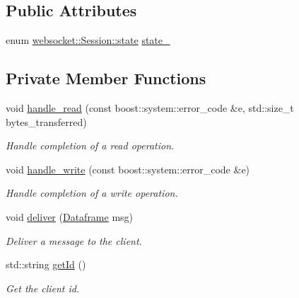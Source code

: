 \subsection*{Public Attributes}
\begin{DoxyCompactItemize}
\item 
enum \hyperlink{classwebsocket_1_1Session_a643e11bb9d05b580f20ff232f3582c1b}{websocket\+::\+Session\+::state} \hyperlink{classwebsocket_1_1Session_a8f9e0d65f4de675dd7b8242e17ee29b7}{state\+\_\+}
\end{DoxyCompactItemize}
\subsection*{Private Member Functions}
\begin{DoxyCompactItemize}
\item 
void \hyperlink{classwebsocket_1_1Session_ad23257dd2bffa48e90ed9941d39ca56b}{handle\+\_\+read} (const boost\+::system\+::error\+\_\+code \&e, std\+::size\+\_\+t bytes\+\_\+transferred)
\begin{DoxyCompactList}\small\item\em Handle completion of a read operation. \end{DoxyCompactList}\item 
void \hyperlink{classwebsocket_1_1Session_aa3912eefe7b2d125d0f3739c96f98a83}{handle\+\_\+write} (const boost\+::system\+::error\+\_\+code \&e)
\begin{DoxyCompactList}\small\item\em Handle completion of a write operation. \end{DoxyCompactList}\item 
void \hyperlink{classwebsocket_1_1Session_a6af4fbb5ea959b9e079e779a887c4f27}{deliver} (\hyperlink{structwebsocket_1_1Dataframe}{Dataframe} msg)
\begin{DoxyCompactList}\small\item\em Deliver a message to the client. \end{DoxyCompactList}\item 
std\+::string \hyperlink{classwebsocket_1_1Session_a1da5647ac33cae9b350b586a25297323}{get\+Id} ()
\begin{DoxyCompactList}\small\item\em Get the client id. \end{DoxyCompactList}\end{DoxyCompactItemize}
